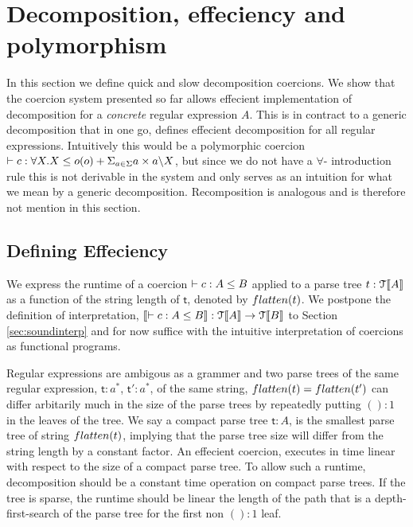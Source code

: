 \documentclass[a4paper,UKenglish,cleveref, autoref, thm-restate]{lipics-v2021}
\begin{document}
\section{Decomposition, effeciency and polymorphism}
In this section we define quick and slow decomposition coercions. We show that the coercion system presented so far allows effecient implementation of decomposition for a \textit{concrete} regular expression $A$. This is in contract to a generic decomposition that in one go, defines effecient decomposition for all regular expressions. Intuitively this would be a polymorphic coercion $\contains{}{c}{\forall X. X}{\myo{o} + \decomp{X}}$, but since we do not have a $\forall$- introduction rule this is not derivable in the system and only serves as an intuition for what we mean by a generic decomposition. Recomposition is analogous and is therefore not mention in this section.
\subsection{Defining Effeciency}
We express the runtime of a coercion $\contains{}{c}{A}{B}$ applied to a parse tree $\mathsf{t} : \type{A}$ as a function of the string length of $\mathsf{t}$, denoted by $\flatten{\mathsf{t}}$. We postpone the definition of interpretation, $\interp{\contains{}{c}{A}{B}} : \type{A} \rightarrow \type{B}$ to Section \ref{sec:soundinterp} and for now suffice with the intuitive interpretation of coercions as functional programs.

Regular expressions are ambigous as a grammer and two parse trees of the same regular expression, $\mathsf{t} : a^*$, $\mathsf{t'} : a^*$, of the same string, $\flatten{t}=\flatten{t'}$ can differ arbitarily much in the size of the parse trees by repeatedly putting  $() : 1$ in the leaves of the tree. We say a compact parse tree $\mathsf{t} : A$, is the smallest parse tree of string $\flatten{t}$, implying that the parse tree size will differ from the string length by a constant factor. An effecient coercion, executes in time linear with respect to the size of a compact parse tree.
To allow such a runtime, decomposition should be a constant time operation on compact parse trees. If the tree is sparse, the runtime should be linear the length of the path that is a depth-first-search of the parse tree for the first non $(): 1$ leaf.
\end{document}
